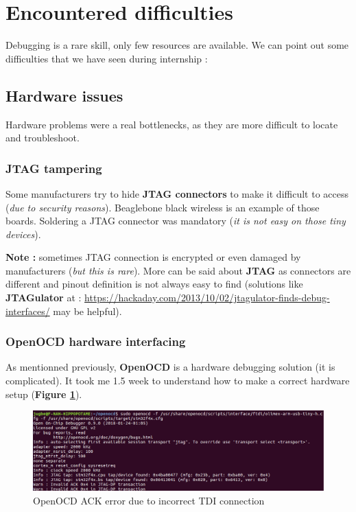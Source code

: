 \section{Encountered difficulties}
Debugging is a rare skill, only few resources are available. We can point out some difficulties that we have seen during internship :

\subsection{Hardware issues}
Hardware problems were a real bottlenecks, as they are more difficult to locate and troubleshoot.
\subsubsection{JTAG tampering}
Some manufacturers try to hide \textbf{JTAG connectors} to make it difficult to access (\textit{due to security reasons}). Beaglebone black wireless is an example of those boards. Soldering a JTAG connector was mandatory (\textit{it is not easy on those tiny devices}).

\textbf{\color{orange}Note : } sometimes JTAG connection is encrypted or even damaged by manufacturers (\textit{but this is rare}). 
More can be said about \textbf{JTAG} as connectors are different and pinout definition is not always easy to find (solutions like \textbf{JTAGulator} at : {\color{blue}\url{https://hackaday.com/2013/10/02/jtagulator-finds-debug-interfaces/}} may be helpful).
\subsubsection{OpenOCD hardware interfacing}
As mentionned previously, \textbf{OpenOCD} is a hardware debugging solution (it is complicated). It took me 1.5 week to understand how to make a correct hardware setup (\textbf{Figure \ref{OpenOCD ACK error due to incorrect TDI connection}}).


\begin{figure}[H]
		\centering
        \includegraphics[scale=0.40]{img/issues/tdi-not-connected-openocd.png}
        \caption{OpenOCD ACK error due to incorrect TDI connection}
        \label{OpenOCD ACK error due to incorrect TDI connection}
    \end{figure}


